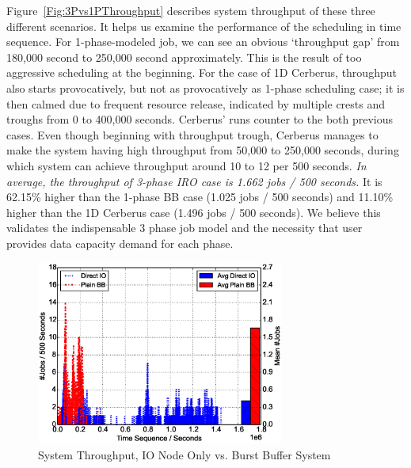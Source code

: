 Figure~\ref{Fig:3Pvs1PThroughput} describes system throughput of these three different scenarios.
It helps us examine the performance of the scheduling in time sequence.
For 1-phase-modeled job, we can see an obvious `throughput gap'
from 180,000 second to 250,000 second approximately.
This is the result of too aggressive scheduling at the beginning.
For the case of 1D Cerberus, throughput also starts provocatively,
but not as provocatively as 1-phase scheduling case;
it is then calmed due to frequent resource release,
indicated by multiple crests and troughs from 0 to 400,000 seconds.
Cerberus' runs counter to the both previous cases.
Even though beginning with throughput trough,
Cerberus manages to make the system having high throughput from 50,000 to 250,000 seconds,
during which system can achieve throughput around 10 to 12 per 500 seconds. 
\textit{In average, the throughput of 3-phase IRO case is 1.662 jobs / 500 seconds.}
It is 62.15\% higher than the 1-phase BB case (1.025 jobs / 500 seconds) and
11.10\% higher than the 1D Cerberus case (1.496 jobs / 500 seconds).
We believe this validates the indispensable 3 phase job model and
the necessity that user provides data capacity demand for each phase.


\begin{figure}[!t]
        \centering
        \includegraphics[width=3.2in]{DrawDirectIOvsBB/1000jobs_direct_vs_bb_throughput}
        \caption{System Throughput, IO Node Only vs. Burst Buffer System}
        \label{Fig:DirectIOvsBBThroughput}
\end{figure}

